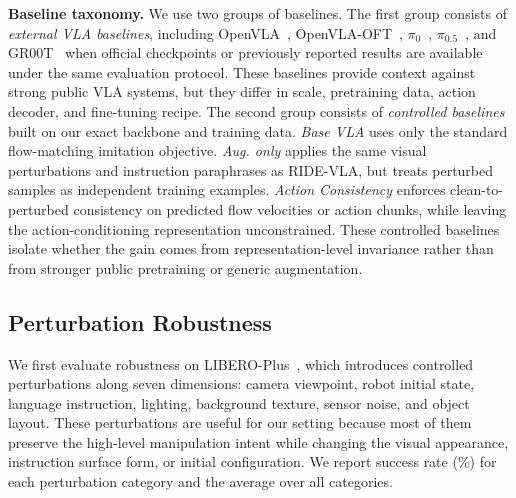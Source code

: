 \documentclass[letterpaper]{article} %
\newcommand{\method}{\textsc{RIDE-VLA}}
\begin{document}
\textbf{Baseline taxonomy.} We use two groups of baselines. The first group consists of \textit{external VLA baselines}, including OpenVLA~\cite{DBLP:conf/corl/KimPKXB0RFSVKBT24}, OpenVLA-OFT~\cite{DBLP:journals/corr/abs-2502-19645}, $\pi_0$~\cite{DBLP:journals/corr/abs-2410-24164}, $\pi_{0.5}$~\cite{pi05}, and GR00T~\cite{DBLP:journals/corr/abs-2503-14734} when official checkpoints or previously reported results are available under the same evaluation protocol. These baselines provide context against strong public VLA systems, but they differ in scale, pretraining data, action decoder, and fine-tuning recipe. The second group consists of \textit{controlled baselines} built on our exact backbone and training data. \textit{Base VLA} uses only the standard flow-matching imitation objective. \textit{Aug. only} applies the same visual perturbations and instruction paraphrases as \method{}, but treats perturbed samples as independent training examples. \textit{Action Consistency} enforces clean-to-perturbed consistency on predicted flow velocities or action chunks, while leaving the action-conditioning representation unconstrained. These controlled baselines isolate whether the gain comes from representation-level invariance rather than from stronger public pretraining or generic augmentation.

\subsection{Perturbation Robustness}

We first evaluate robustness on LIBERO-Plus~\cite{DBLP:journals/corr/abs-2510-13626}, which introduces controlled perturbations along seven dimensions: camera viewpoint, robot initial state, language instruction, lighting, background texture, sensor noise, and object layout. These perturbations are useful for our setting because most of them preserve the high-level manipulation intent while changing the visual appearance, instruction surface form, or initial configuration. We report success rate (\%) for each perturbation category and the average over all categories.
\end{document}
